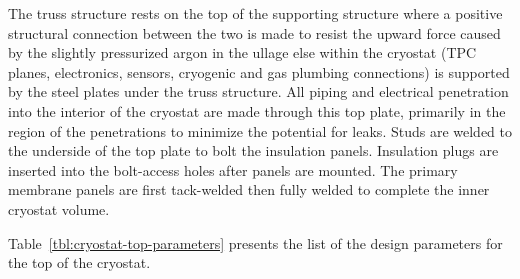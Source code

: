 The truss structure rests on the top of the supporting structure where a positive structural connection 
between the two is made to resist the upward force caused by the slightly pressurized argon in the ullage 
else within the cryostat (TPC planes, electronics, sensors, cryogenic and gas plumbing connections) is 
supported by the steel plates under the truss structure. All piping and electrical penetration into the 
interior of the cryostat are made through this top plate, primarily in the region of the penetrations to 
minimize the potential for leaks. Studs are welded to the underside of the top plate to bolt the insulation 
panels. Insulation plugs are inserted into the bolt-access holes after panels are mounted. The primary 
membrane panels are first tack-welded then fully welded to complete the inner cryostat volume.


Table~\ref{tbl:cryostat-top-parameters} presents the list of the design parameters for the top of the cryostat.


